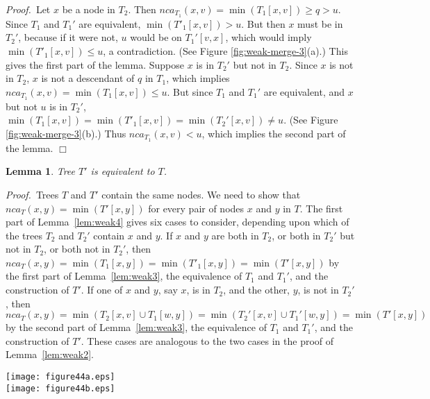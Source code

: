 \documentclass[twoside,leqno,twocolumn]{article}
\newtheorem{lemma}{Lemma}
\newcommand{\proof}{\noindent \emph{Proof.}\ }
\newcommand{\proofend}{$\Box$\\}
\newcommand{\nca}{\mathit{nca}}
\begin{document}
\proof Let $x$ be a node in $T_2$. Then $\nca_{T_1}(x, v) = \min(T_1[x, v]) \geq q > u$.  Since $T_1$ and $T_1'$ are equivalent, $\min(T'_1[x, v]) > u$.  But then $x$ must be in $T_2'$, because if it were not, $u$ would be on $T_1'[v,x]$,  which would imply
$\min(T'_1[x, v]) \leq u$, a contradiction. (See Figure \ref{fig:weak-merge-3}(a).) This gives the first part of the lemma.  Suppose $x$ is in $T_2'$ but not in $T_2$.  Since $x$ is not in $T_2$, $x$ is not a descendant of $q$ in $T_1$, which implies $\nca_{T_1}(x, v) =
\min(T_1[x, v]) \leq u$.  But since $T_1$ and $T_1'$ are equivalent, and $x$ but not $u$ is in $T_2'$, $\min(T_1[x,v]) = \min(T'_1[x, v]) = \min(T_2'[x, v]) \neq u$. (See Figure \ref{fig:weak-merge-3}(b).) Thus $\nca_{T_1}(x, v) < u$, which implies the second part of the lemma. \proofend

\begin{lemma}\label{lem:weak5} Tree $T'$ is equivalent to $T$.
\end{lemma}
\proof Trees $T$ and $T'$ contain the same nodes.  We need to show that $\nca_T(x, y) = \min(T'[x, y])$ for every pair of nodes $x$ and $y$ in $T$.  The first part of Lemma~\ref{lem:weak4} gives six cases to consider, depending upon which of the trees $T_2$ and $T_2'$ contain $x$ and $y$.  If $x$ and $y$ are both in $T_2$, or both in $T_2'$ but not in $T_2$, or both not in $T_2'$, then $\nca_T(x, y) =
\min(T_1[x, y]) = \min(T'_1[x, y]) = \min(T'[x, y])$ by the first part of Lemma~\ref{lem:weak3}, the equivalence of $T_1$ and $T_1'$, and the construction of $T'$.  If one of $x$ and $y$, say $x$, is in $T_2$, and the other, $y$, is not in $T_2'$, then $\nca_T(x,y) = \min(T_2[x, v] \cup T_1[w,y])= \min(T_2'[x, v] \cup T_1'[w, y]) = \min(T'[x, y])$ by the second part of Lemma~\ref{lem:weak3}, the equivalence of $T_1$ and $T_1'$, and the construction of $T'$.  These cases are analogous to the two cases in the proof of Lemma~\ref{lem:weak2}.

\begin{figure*}\begin{center}
\resizebox{.65\textwidth}{!} {\texttt{[image: figure44a.eps]}}\\
\vspace{.5cm}
\resizebox{.65\textwidth}{!} {\texttt{[image: figure44b.eps]}}
\end{center}
\caption{\label{fig:weak-merge-4} Proof of Lemma~\ref{lem:weak5}. Node $u = \nca_{T_1}(v,w)$, $q$ is the child of $u$ in $T_1$ that is an ancestor of $v$, and $r$ is the parent of $u$ in $T_1'$. After the merge, $\min \{v,w\}$ and $q$ are on $T[u,\max\{v,w\}]$.
(a) Node $x$ is in $T_2$ and $y$ is in $T'_2$ but not in $T_2$. Then $y$ is not a descendant of $u$ in $T_1$, so $\nca_{T_1}(x,y) < u$. Since $x \in T_2$, $\min(T_2[x,v])>u$. These two facts imply $\nca_T(x,y)=\min(T'[x,y])$. (b) Node $x$ is in $T'_2$ but not in $T_2$ and $y$ is not in $T'_2$. Then $\nca_{T}(x,y) = \min(T'_1[x,y]) < u$. All nodes in $T'_1[v,w]$ are greater than or equal to $u$; thus $\nca_T(x,y) = \min(T'[x,y])$.}
\end{figure*}
\end{document}
